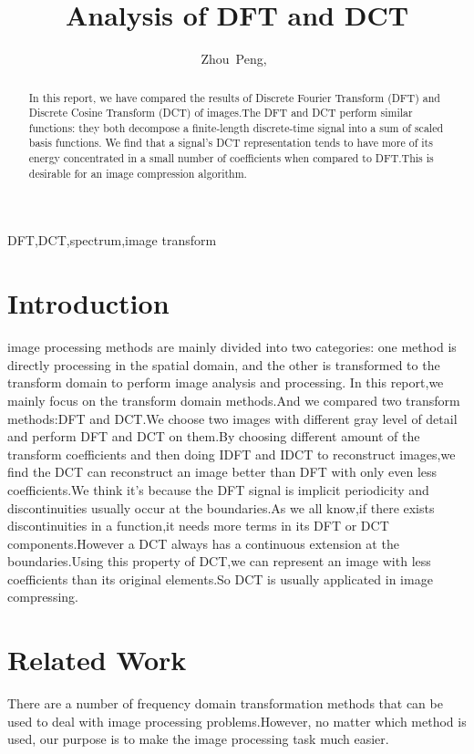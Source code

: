 \documentclass[journal,comsoc]{IEEEtran}
\begin{document}
\title{Analysis of DFT and DCT}
\author{Zhou~Peng,~}
\maketitle

\begin{abstract}
  In this report, we have compared the results of Discrete Fourier Transform (DFT)
  and Discrete Cosine Transform (DCT) of images.The DFT and DCT perform similar functions:
  they both decompose a finite-length discrete-time signal into a sum of scaled basis functions.
  We find that a signal's DCT representation tends to have more of its energy concentrated in
  a small number of coefficients when compared to DFT.This is desirable for an image compression algorithm. 
\end{abstract}

\begin{IEEEkeywords}
DFT,DCT,spectrum,image transform
\end{IEEEkeywords}

\section{Introduction}
 image processing methods are mainly divided into
two categories: one method is directly processing in the spatial domain,
and the other is transformed to the transform domain to perform image analysis and processing.
In this report,we mainly focus on the transform domain methods.And we compared two transform
methods:DFT and DCT.We choose two images with different gray level of detail and perform
DFT and DCT on them.By choosing different amount of the transform coefficients and then
doing IDFT and IDCT to reconstruct images,we find the DCT can reconstruct an image better
than DFT with only even less coefficients.We think it's because the DFT signal is implicit
periodicity and discontinuities usually occur at the boundaries.As we all know,if there exists
discontinuities in a function,it needs more terms in its DFT or DCT components.However a DCT
always has a continuous extension at the boundaries.Using this property of DCT,we can represent
an image with less coefficients than its original elements.So DCT is usually applicated in
image compressing.

\section{Related Work}
\label{sec:related work}
There are a number of frequency domain transformation methods that can be used to deal with
image processing problems.However, no matter which method is used, our purpose is to make
the image processing task much easier.
\end{document}
